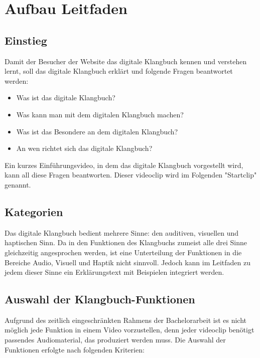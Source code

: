 
\section{Aufbau Leitfaden}




\subsection{Einstieg}
Damit der Besucher der Website das digitale Klangbuch kennen und verstehen lernt, soll das digitale Klangbuch erklärt und folgende Fragen beantwortet werden:

\begin{itemize}
\item Was ist das digitale Klangbuch?
\item Was kann man mit dem digitalen Klangbuch machen?
\item Was ist das Besondere an dem digitalen Klangbuch?
\item An wen richtet sich das digitale Klangbuch?
\end{itemize}

Ein kurzes Einführungsvideo, in dem das digitale Klangbuch vorgestellt wird, kann all diese Fragen beantworten. Dieser \gls{videoclip} wird im Folgenden "Startclip" genannt.




\subsection{Kategorien}
Das digitale Klangbuch bedient mehrere Sinne: den auditiven, visuellen und haptischen Sinn. Da in den Funktionen des Klangbuchs zumeist alle drei Sinne gleichzeitig angesprochen werden, ist eine Unterteilung der Funktionen in die Bereiche Audio, Visuell und Haptik nicht sinnvoll. Jedoch kann im Leitfaden zu jedem dieser Sinne ein Erklärungstext mit Beispielen integriert werden.\\




\subsection{Auswahl der Klangbuch-Funktionen}
Aufgrund des zeitlich eingeschränkten Rahmens der Bachelorarbeit ist es nicht möglich jede Funktion in einem Video vorzustellen, denn jeder \gls{videoclip} benötigt passendes Audiomaterial, das produziert werden muss. Die Auswahl der Funktionen erfolgte nach folgenden Kriterien:\\

